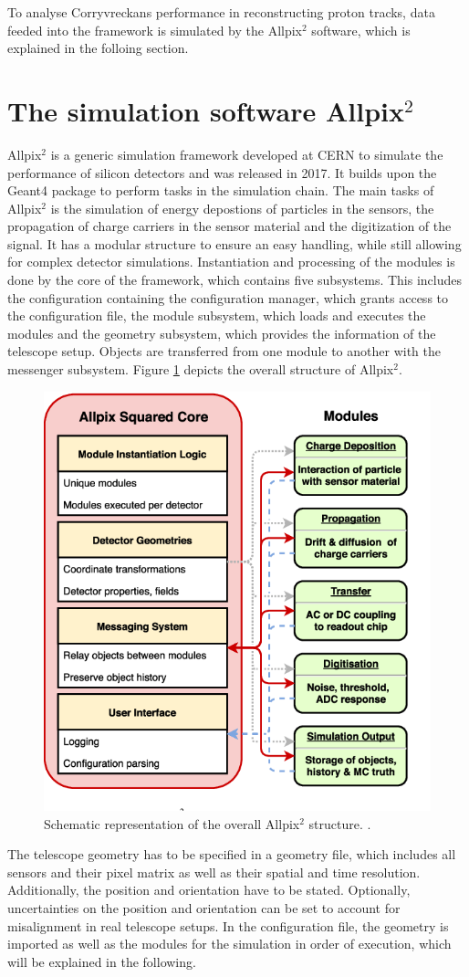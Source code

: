 To analyse Corryvreckans performance in reconstructing proton tracks, data feeded into the framework is simulated by the Allpix$^2$ software,
which is explained in the folloing section.

\section{The simulation software Allpix$^2$}
Allpix$^2$ is a generic simulation framework developed at CERN to simulate the performance of silicon detectors and was released in 2017.
It builds upon the
Geant4 \cite{geant4} package to perform tasks in the simulation chain. The main tasks of Allpix$^2$ is the simulation of energy depostions of particles
in the sensors, the propagation of charge carriers in the sensor material and the digitization of the signal. It has a modular
structure to ensure an easy handling, while still allowing for complex detector simulations.
Instantiation and processing of the modules is done by the core of the framework,
which contains five subsystems. This includes the configuration containing the configuration manager, which grants access to the configuration file, the
module subsystem, which loads and executes the modules and the geometry subsystem, which provides the information of the telescope setup.
Objects are transferred from one module to another with the messenger subsystem.
Figure \ref{fig:allpix} depicts the overall structure of Allpix$^2$.

\begin{figure}
  \centering
  \includegraphics[height=0.5\textwidth]{images/allpix.png}
  \caption{Schematic representation of the overall Allpix$^2$ structure. \cite{fig_allpix}.}
  \label{fig:allpix}
\end{figure}

The telescope geometry has to be specified in a geometry file, which includes all sensors and their pixel matrix as well as their spatial and time
resolution. Additionally,
the position and orientation have to be stated. Optionally, uncertainties on the position and orientation can be set to account for misalignment in real
telescope setups.
In the configuration file, the geometry is imported as well as the modules for the simulation in order of execution, which
will be explained in the following.

